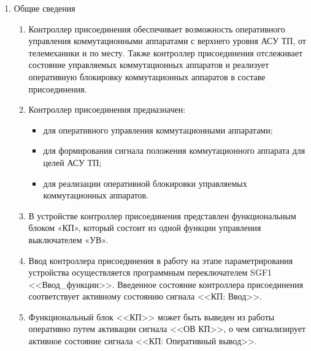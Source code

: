 
\color{black}

\begin{enumerate}


\item Общие сведения

\begin{enumerate}

\item 
Контроллер присоединения обеспечивает возможность оперативного управления коммутационными аппаратами с верхнего уровня АСУ ТП, от телемеханики и по месту. Также контроллер присоединения отслеживает состояние управляемых коммутационных аппаратов и реализует оперативную блокировку коммутационных аппаратов в составе присоединения.

\item
Контроллер присоединения предназначен:
\begin{itemize}
\item для оперативного управления коммутационными аппаратами; 
\item для формирования сигнала положения коммутационного аппарата для целей АСУ ТП; 
\item для реализации оперативной блокировки управляемых коммутационных аппаратов.
\end{itemize}

\item
В устройстве контроллер присоединения представлен функциональным блоком «КП», который состоит из одной функции управления выключателем «УВ».

\item
Ввод контроллера присоединения в работу на этапе параметрирования устройства осуществляется программным переключателем SGF1 <<Ввод\_функции>>. Введенное состояние контроллера присоединения соответствует активному состоянию сигнала <<КП: Ввод>>.

\item
Функциональный блок <<КП>> может быть выведен из работы оперативно путем активации сигнала <<ОВ КП>>, о чем сигнализирует активное состояние сигнала <<КП: Оперативный вывод>>.


\end{enumerate}
\end{enumerate}
